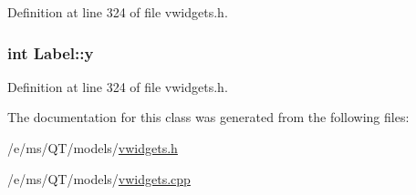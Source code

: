 Definition at line 324 of file vwidgets.h.

\hypertarget{classLabel_af7de5d7b7af764667a51747ba6fd5a2e}{
\subsubsection[{y}]{\setlength{\rightskip}{0pt plus 5cm}int {\bf Label::y}}}
\label{classLabel_af7de5d7b7af764667a51747ba6fd5a2e}


Definition at line 324 of file vwidgets.h.



The documentation for this class was generated from the following files:\begin{DoxyCompactItemize}
\item 
/e/ms/QT/models/\hyperlink{vwidgets_8h}{vwidgets.h}\item 
/e/ms/QT/models/\hyperlink{vwidgets_8cpp}{vwidgets.cpp}\end{DoxyCompactItemize}
